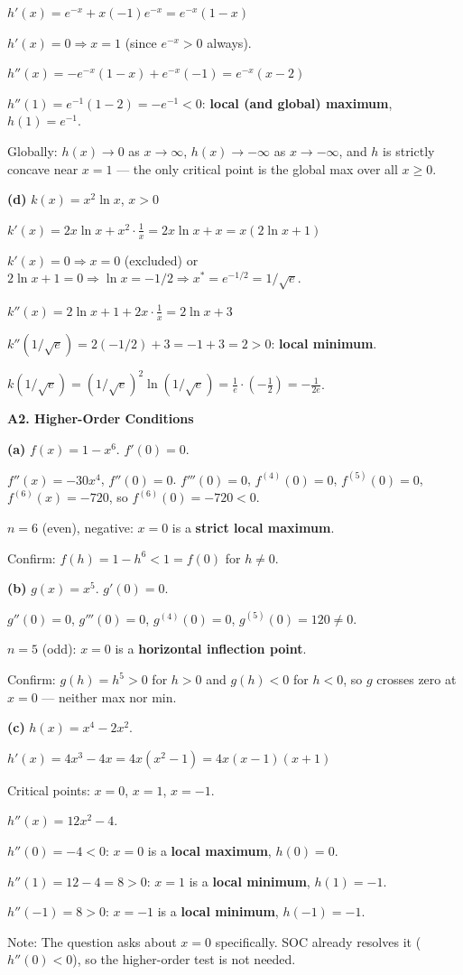 \documentclass[12pt, a4paper]{article}
\theoremstyle{definition}
\begin{document}
\begin{solbox}
$h'(x) = e^{-x} + x(-1)e^{-x} = e^{-x}(1-x)$

$h'(x)=0 \Rightarrow x=1$ (since $e^{-x}>0$ always).

$h''(x) = -e^{-x}(1-x) + e^{-x}(-1) = e^{-x}(x-2)$

$h''(1) = e^{-1}(1-2) = -e^{-1} < 0$: \textbf{local (and global) maximum}, $h(1)=e^{-1}$.

Globally: $h(x)\to 0$ as $x\to\infty$, $h(x)\to-\infty$ as $x\to-\infty$, and $h$ is strictly concave near $x=1$ --- the only critical point is the global max over all $x\geq 0$.

\medskip
\textbf{(d)} $k(x) = x^2\ln x$, $x>0$

$k'(x) = 2x\ln x + x^2\cdot\frac{1}{x} = 2x\ln x + x = x(2\ln x+1)$

$k'(x)=0 \Rightarrow x=0$ (excluded) or $2\ln x+1=0 \Rightarrow \ln x = -1/2 \Rightarrow x^*=e^{-1/2}=1/\sqrt{e}$.

$k''(x) = 2\ln x+1+2x\cdot\frac{1}{x} = 2\ln x+3$

$k''(1/\sqrt{e}) = 2(-1/2)+3 = -1+3 = 2>0$: \textbf{local minimum}.

$k(1/\sqrt{e}) = (1/\sqrt{e})^2\ln(1/\sqrt{e}) = \frac{1}{e}\cdot(-\frac{1}{2}) = -\frac{1}{2e}$.
\end{solbox}

\begin{solbox}
\textbf{A2. Higher-Order Conditions}

\textbf{(a)} $f(x) = 1-x^6$. $f'(0)=0$.

$f''(x)=-30x^4$, $f''(0)=0$.
$f'''(0)=0$, $f^{(4)}(0)=0$, $f^{(5)}(0)=0$,
$f^{(6)}(x)=-720$, so $f^{(6)}(0)=-720<0$.

$n=6$ (even), negative: $x=0$ is a \textbf{strict local maximum}.

Confirm: $f(h)=1-h^6<1=f(0)$ for $h\neq 0$. \checkmark

\medskip
\textbf{(b)} $g(x)=x^5$. $g'(0)=0$.

$g''(0)=0$, $g'''(0)=0$, $g^{(4)}(0)=0$, $g^{(5)}(0)=120\neq 0$.

$n=5$ (odd): $x=0$ is a \textbf{horizontal inflection point}.

Confirm: $g(h)=h^5>0$ for $h>0$ and $g(h)<0$ for $h<0$, so $g$ crosses zero at $x=0$ --- neither max nor min. \checkmark

\medskip
\textbf{(c)} $h(x) = x^4-2x^2$.

$h'(x) = 4x^3-4x = 4x(x^2-1) = 4x(x-1)(x+1)$

Critical points: $x=0$, $x=1$, $x=-1$.

$h''(x) = 12x^2-4$.

$h''(0) = -4 < 0$: $x=0$ is a \textbf{local maximum}, $h(0)=0$.

$h''(1)=12-4=8>0$: $x=1$ is a \textbf{local minimum}, $h(1)=-1$.

$h''(-1)=8>0$: $x=-1$ is a \textbf{local minimum}, $h(-1)=-1$.

Note: The question asks about $x=0$ specifically.
SOC already resolves it ($h''(0)<0$), so the higher-order test is not needed.
\end{solbox}
\end{document}
